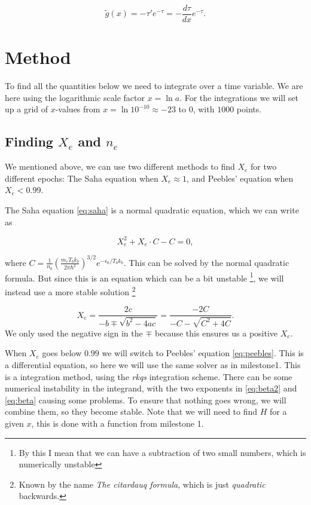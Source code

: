 \documentclass[a4paper,norsk, 10pt]{article}
\begin{document}
\begin{equation}\label{eq:g}
\tilde{g} (x) = -\tau'e^{-\tau} = -\frac{d\tau}{dx}e^{-\tau}.
\end{equation}


\section{Method}
To find all the quantities below we need to integrate over a time variable. We are here using the logarithmic scale factor $x = \ln a$. For the integrations we will set up a grid of $x$-values from $x = \ln 10^{-10} \approx -23$ to $0$, with $1000$ points.

\subsection{Finding $X_e$ and $n_e$}
We mentioned above, we can use two different methods to find $X_e$ for two different epochs: The Saha equation when $X_e \approx 1$, and Peebles' equation when $X_e < 0.99$. 

The Saha equation \eqref{eq:saha} is a normal quadratic equation, which we can write as

\begin{equation}
X_e^2 + X_e\cdot C - C = 0,
\end{equation}

where $C = \frac{1}{n_b}\left(\frac{m_e T_b k_b}{2\pi \hbar^2}\right)^{3/2} e^{-\epsilon_0/T_b k_b}$. This can be solved by the normal quadratic formula. But since this is an equation which can be a bit unstable \footnote{By this I mean that we can have a subtraction of two small numbers, which is numerically unstable}, we will instead use a more stable solution \footnote{Known by the name \textit{The citardauq formula}, which is just \textit{quadratic} backwards.}

\begin{equation}
X_e = \frac{2c}{-b \mp \sqrt{b^2 - 4ac}} = \frac{-2C}{-C - \sqrt{C^2 + 4C}}.
\end{equation}
We only used the negative sign in the $\mp$ because this ensures us a positive $X_e$.

When $X_e$ goes below $0.99$ we will switch to Peebles' equation \eqref{eq:peebles}. This is a differential equation, so here we will use the same solver as in milestone1. This is a integration method, using the \textit{rkqs} integration scheme. There can be some numerical instability in the integrand, with the two exponents in \eqref{eq:beta2} and \eqref{eq:beta} causing some problems. To ensure that nothing goes wrong, we will combine them, so they become stable. Note that we will need to find $H$ for a given $x$, this is done with a function from milestone 1.
\end{document}
